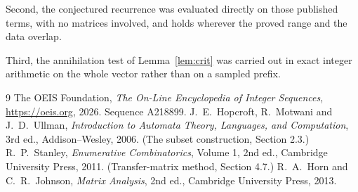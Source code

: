 \documentclass[11pt,a4paper]{article}
\theoremstyle{plain}
\theoremstyle{definition}
\begin{document}
Second, the conjectured recurrence was evaluated directly on those published terms, with no
matrices involved, and holds wherever the proved range and the data overlap.

Third, the annihilation test of Lemma~\ref{lem:crit} was carried out in exact integer
arithmetic on the whole vector rather than on a sampled prefix.

\begin{thebibliography}{9}
 The OEIS Foundation, \emph{The On-Line Encyclopedia of Integer
Sequences}, \url{https://oeis.org}, 2026. Sequence A218899.
 J.~E.~Hopcroft, R.~Motwani and J.~D.~Ullman, \emph{Introduction to Automata
Theory, Languages, and Computation}, 3rd ed., Addison--Wesley, 2006. (The subset
construction, Section 2.3.)
 R.~P.~Stanley, \emph{Enumerative Combinatorics}, Volume 1, 2nd ed.,
Cambridge University Press, 2011. (Transfer-matrix method, Section 4.7.)
 R.~A.~Horn and C.~R.~Johnson, \emph{Matrix Analysis}, 2nd ed., Cambridge
University Press, 2013.
\end{thebibliography}
\end{document}
